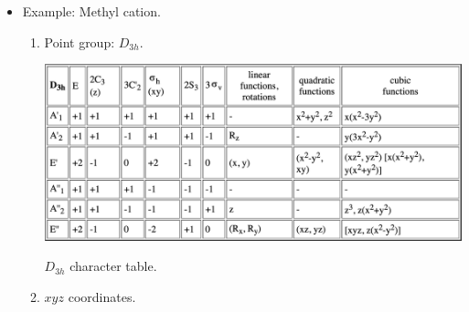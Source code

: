 \documentclass[../notes.tex]{subfiles}
\begin{document}
\begin{itemize}
    \item Example: Methyl cation.
    \begin{enumerate}
        \item Point group: $D_{3h}$.
        \begin{table}[h!]
            \centering
            \includegraphics[width=0.8\linewidth]{../ExtFiles/charTableD3h.png}
            \caption{$D_{3h}$ character table.}
            \label{tab:charTableD3h}
        \end{table}
        \item $xyz$ coordinates.
        \begin{figure}[H]
            \centering
\end{figure}
\end{enumerate}
\end{itemize}
\end{document}
